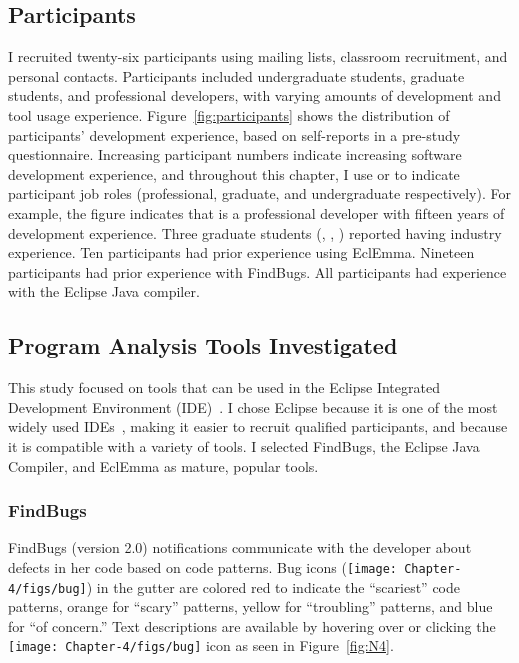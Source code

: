 \subsection{Participants} \label{participants}

I recruited twenty-six participants using mailing lists, classroom recruitment, and personal
contacts. Participants included undergraduate students, graduate students, and
professional developers, with varying amounts of development and tool
usage experience. Figure~\ref{fig:participants} shows the distribution of
participants' development experience, based on self-reports in a pre-study
questionnaire. 
Increasing participant numbers indicate increasing software development experience,
and throughout this chapter, I use  or  
 to indicate participant job roles (professional, graduate, and undergraduate respectively).
For example, the figure indicates that  is a professional developer with fifteen years of development experience. 
Three graduate students (, , ) reported having industry experience.
Ten participants had prior experience using EclEmma. 
Nineteen participants had prior experience with FindBugs. 
All participants had experience with the Eclipse Java compiler.

\subsection{Program Analysis Tools Investigated} \label{TUI}

This study focused on tools that can be used in the Eclipse
Integrated Development Environment (IDE)~\cite{EclipseIDE}. 
I chose Eclipse because it is one of the most widely used IDEs~\cite{Goth:2005:Beware}, 
making it easier to recruit qualified participants,
and because it is compatible with a variety of tools. I selected FindBugs, the Eclipse Java Compiler, and
EclEmma as mature, popular tools.


\subsubsection*{FindBugs}

FindBugs (version 2.0) notifications communicate with the developer about defects in her
code based on code patterns. Bug icons (\texttt{[image: Chapter-4/figs/bug]}) in the gutter are colored red
to indicate the ``scariest'' code patterns, orange for ``scary'' patterns, yellow
for ``troubling'' patterns, and blue for ``of concern.'' Text descriptions are
available by hovering over or clicking the \texttt{[image: Chapter-4/figs/bug]} icon as seen in Figure~\ref{fig:N4}.

